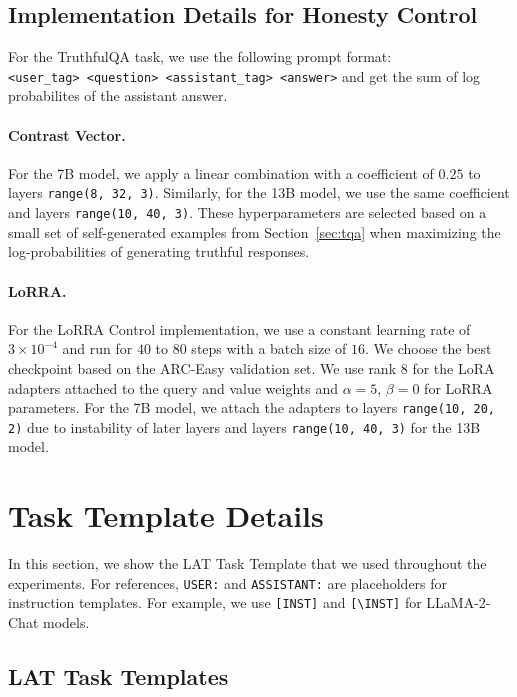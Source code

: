 \subsection{Implementation Details for Honesty Control}
For the TruthfulQA task, we use the following prompt format: \\
\texttt{<user\_tag> <question> <assistant\_tag> <answer>} and get the sum of log probabilites of the assistant answer.

\label{sec:lorra_honesty_details}
\paragraph{Contrast Vector.} For the 7B model, we apply a linear combination with a coefficient of \(0.25\) to layers \texttt{range(8, 32, 3)}. Similarly, for the 13B model, we use the same coefficient and layers \texttt{range(10, 40, 3)}. These hyperparameters are selected based on a small set of self-generated examples from Section~\ref{sec:tqa} when maximizing the log-probabilities of generating truthful responses.

\paragraph{LoRRA.}
For the LoRRA Control implementation, we use a constant learning rate of \(3 \times 10^{-4}\) and run for $40$ to $80$ steps with a batch size of $16$. We choose the best checkpoint based on the ARC-Easy validation set. We use rank $8$ for the LoRA adapters attached to the query and value weights and $\alpha=5$, $\beta=0$ for LoRRA parameters. For the 7B model, we attach the adapters to layers \texttt{range(10, 20, 2)} due to instability of later layers and layers \texttt{range(10, 40, 3)} for the 13B model.


\section{Task Template Details}

In this section, we show the LAT Task Template that we used throughout the experiments. For references, \texttt{USER:} and \texttt{ASSISTANT:}
are placeholders for instruction templates. For example, we use \texttt{[INST]} and \texttt{[\textbackslash INST]} for LLaMA-2-Chat models.

\subsection{LAT Task Templates}
\label{appendix:lat_prompts}
